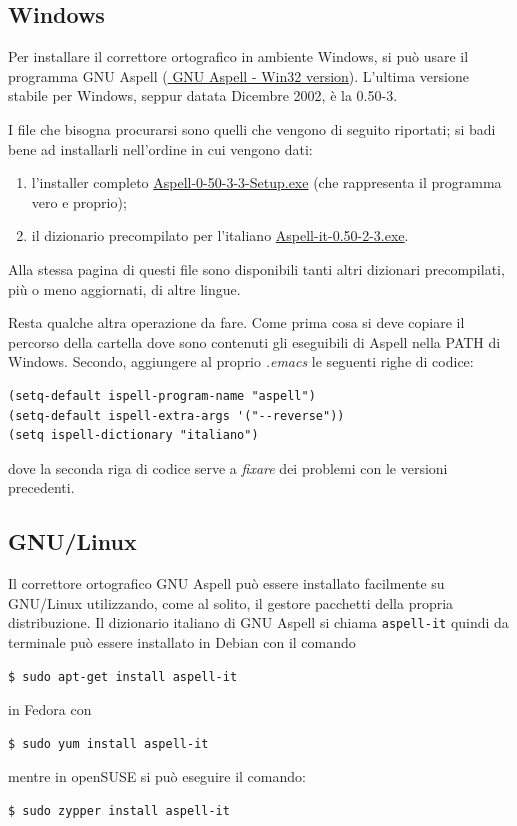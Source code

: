 \documentclass[10pt,a4paper]{article}
\begin{document}
\subsection*{Windows}
\label{sec:aspellwin}
Per installare il correttore ortografico in ambiente
Windows, si può usare il programma \textsf{GNU Aspell}
(\href{http://aspell.net/win32/}{\mano{} \textsf{GNU Aspell - Win32 version}}). L'ultima
versione stabile per Windows, seppur datata Dicembre 2002, è la \textsf{0.50-3}.

I file che bisogna procurarsi sono quelli che vengono di seguito
riportati; si badi bene ad installarli nell'ordine in cui vengono dati:

\begin{enumerate}
\item l'installer completo \href{http://ftp.gnu.org/gnu/aspell/w32/Aspell-0-50-3-3-Setup.exe}%
{\textsf{Aspell-0-50-3-3-Setup.exe}} (che rappresenta il programma
vero e proprio);
\item il dizionario precompilato per l'italiano
\href{http://ftp.gnu.org/gnu/aspell/w32/Aspell-it-0.50-2-3.exe}%
{\textsf{Aspell-it-0.50-2-3.exe}}.
\end{enumerate}

Alla stessa pagina di questi file sono disponibili tanti altri
dizionari precompilati, più o meno aggiornati, di altre lingue.

Resta qualche altra operazione da fare. Come prima cosa si deve copiare il
percorso della cartella dove sono contenuti gli eseguibili di Aspell nella
\textsf{PATH} di Windows. Secondo, aggiungere al proprio \emph{.emacs} le seguenti
righe di codice:

\begin{Verbatim}
(setq-default ispell-program-name "aspell")
(setq-default ispell-extra-args '("--reverse"))
(setq ispell-dictionary "italiano")
\end{Verbatim}
dove la seconda riga di codice serve a \emph{fixare} dei problemi con le versioni
precedenti.

\subsection*{GNU/Linux}
\label{sec:aspelllinux}

Il correttore ortografico GNU Aspell può essere installato facilmente su
GNU/Linux utilizzando, come al solito, il gestore pacchetti della propria
distribuzione. Il dizionario italiano di GNU Aspell si chiama \verb|aspell-it|
quindi da terminale può essere installato in Debian con il comando
\begin{Verbatim}
$ sudo apt-get install aspell-it
\end{Verbatim}
in Fedora con
\begin{Verbatim}
$ sudo yum install aspell-it
\end{Verbatim}
mentre in openSUSE si può eseguire il comando:
\begin{Verbatim}
$ sudo zypper install aspell-it
\end{Verbatim}
\end{document}
